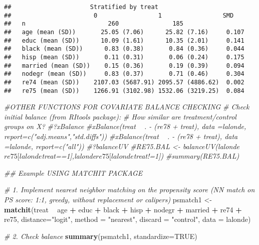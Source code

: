 \documentclass[]{article}
\newenvironment{Shaded}{\begin{snugshade}}{\end{snugshade}}
\newcommand{\CommentTok}[1]{\textcolor[rgb]{0.56,0.35,0.01}{\textit{#1}}}
\newcommand{\DataTypeTok}[1]{\textcolor[rgb]{0.13,0.29,0.53}{#1}}
\newcommand{\KeywordTok}[1]{\textcolor[rgb]{0.13,0.29,0.53}{\textbf{#1}}}
\newcommand{\NormalTok}[1]{#1}
\newcommand{\OperatorTok}[1]{\textcolor[rgb]{0.81,0.36,0.00}{\textbf{#1}}}
\newcommand{\OtherTok}[1]{\textcolor[rgb]{0.56,0.35,0.01}{#1}}
\newcommand{\StringTok}[1]{\textcolor[rgb]{0.31,0.60,0.02}{#1}}
\begin{document}
\begin{verbatim}
##                      Stratified by treat
##                       0                 1                 SMD   
##   n                       260               185                 
##   age (mean (SD))       25.05 (7.06)      25.82 (7.16)     0.107
##   educ (mean (SD))      10.09 (1.61)      10.35 (2.01)     0.141
##   black (mean (SD))      0.83 (0.38)       0.84 (0.36)     0.044
##   hisp (mean (SD))       0.11 (0.31)       0.06 (0.24)     0.175
##   married (mean (SD))    0.15 (0.36)       0.19 (0.39)     0.094
##   nodegr (mean (SD))     0.83 (0.37)       0.71 (0.46)     0.304
##   re74 (mean (SD))    2107.03 (5687.91) 2095.57 (4886.62)  0.002
##   re75 (mean (SD))    1266.91 (3102.98) 1532.06 (3219.25)  0.084
\end{verbatim}

\begin{Shaded}
\begin{Highlighting}[]
\CommentTok{#OTHER FUNCTIONS FOR COVARIATE BALANCE CHECKING}
\CommentTok{# Check initial balance (from RItools package): }
\CommentTok{# How similar are treatment/control groups on X?}
\CommentTok{#?xBalance}
\CommentTok{#xBalance(treat ~ . - (re78 + treat), data =lalonde, report=c("adj.means","std.diffs")) }
\CommentTok{#xBalance(treat ~ . - (re78 + treat), data =lalonde, report=c("all")) }
\CommentTok{#?balanceUV}
\CommentTok{#RE75.BAL  <- balanceUV(lalonde$re75[lalonde$treat==1],lalonde$re75[lalonde$treat!=1])}
\CommentTok{#summary(RE75.BAL)}



\CommentTok{## Example USING MATCHIT PACKAGE }

\CommentTok{# 1. Implement nearest neighbor matching on the propensity score (NN match on PS score: 1:1, greedy, without replacement or calipers)}
\NormalTok{psmatch1 <-}\StringTok{ }\KeywordTok{matchit}\NormalTok{(treat }\OperatorTok{~}\StringTok{ }\NormalTok{age }\OperatorTok{+}\StringTok{ }\NormalTok{educ }\OperatorTok{+}\StringTok{ }\NormalTok{black }\OperatorTok{+}\StringTok{ }\NormalTok{hisp }\OperatorTok{+}\StringTok{ }\NormalTok{nodegr }\OperatorTok{+}\StringTok{ }\NormalTok{married }\OperatorTok{+}\StringTok{ }\NormalTok{re74 }\OperatorTok{+}\StringTok{ }\NormalTok{re75, }
                    \DataTypeTok{distance=}\StringTok{"logit"}\NormalTok{, }\DataTypeTok{method =} \StringTok{"nearest"}\NormalTok{, }\DataTypeTok{discard =} \StringTok{"control"}\NormalTok{, }\DataTypeTok{data =}\NormalTok{ lalonde)}

\CommentTok{# 2. Check balance}
\KeywordTok{summary}\NormalTok{(psmatch1, }\DataTypeTok{standardize=}\OtherTok{TRUE}\NormalTok{)}
\end{Highlighting}
\end{Shaded}
\end{document}
